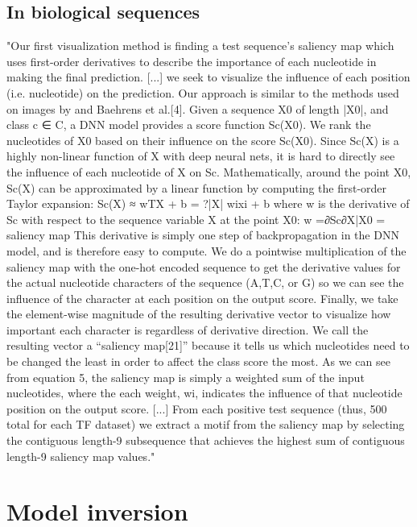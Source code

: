 \documentclass[]{scrartcl}
\begin{document}
\subsection{In biological sequences}
"Our first visualization method is finding a test sequence’s saliency map which uses first-order derivatives to describe the importance of each nucleotide in making the final prediction. [...] we seek to visualize the influence of each position (i.e. nucleotide) on the prediction. Our approach is similar to the methods used on images by \cite{Simonyan2014} and Baehrens et al.[4]. Given a sequence X0 of length |X0|, and class c ∈ C, a DNN model provides a score function Sc(X0). We rank the nucleotides of X0 based on their influence on the score Sc(X0). Since Sc(X) is a highly non-linear function of X with deep neural nets, it is hard to directly see the influence of each nucleotide of X on Sc. Mathematically, around the point X0, Sc(X) can be approximated by a linear function by computing the first-order Taylor expansion:
Sc(X) ≈ wTX + b = ?|X| wixi + b
where w is the derivative of Sc with respect to the sequence variable X at the point X0:
w =∂Sc∂X|X0 = saliency map
This derivative is simply one step of backpropagation in the DNN model, and is therefore easy to compute. We do a pointwise multiplication of the saliency map with the one-hot encoded sequence to get the derivative values for the actual nucleotide characters of the sequence (A,T,C, or G) so we can see the influence of the character at each position on the output score. Finally, we take the element-wise magnitude of the resulting derivative vector to visualize how important each character is regardless of derivative direction. We call the resulting vector a “saliency map[21]” because it tells us which nucleotides need to be changed the least in order to affect the class score the most. As we can see from equation 5, the saliency map is simply a weighted sum of the input nucleotides, where the each weight, wi, indicates the influence of that nucleotide position on the output score.
[...]
From each positive test sequence (thus, 500 total for each TF dataset) we extract a motif from the saliency map by selecting the contiguous length-9 subsequence that achieves the highest sum of contiguous length-9 saliency map values." \cite{Lanchantin2016}


\section{Model inversion}
\end{document}
